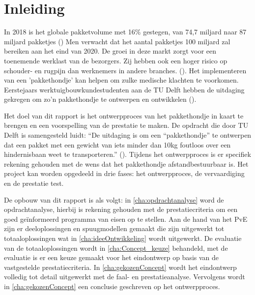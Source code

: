 \chapter{Inleiding}
\label{cha:inleiding}
In 2018 is het globale pakketvolume met 16\% gestegen, van 74,7 miljard naar 87 miljard pakketjes (\cite{pitney_bowes_2018}) Men verwacht dat het aantal pakketjes 100 miljard zal bereiken aan het eind van 2020. De groei in deze markt zorgt voor een toenemende werklast van de bezorgers. Zij hebben ook een hoger risico op schouder- en rugpijn dan werknemers in andere branches. (\cite{hurley_marshall_hogan_wells_2012}). Het implementeren van een 'pakkethondje' kan helpen om zulke medische klachten te voorkomen. Eerstejaars werktuigbouwkundestudenten aan de TU Delft hebben de uitdaging gekregen om zo'n pakkethondje te ontwerpen en ontwikkelen (\cite{beek_2020_opdracht}).
\vspace{\baselineskip}

Het doel van dit rapport is het ontwerpproces van het pakkethondje in kaart te brengen en een voorspelling van de prestatie te maken. De opdracht die door TU Delft is samengesteld luidt: “De uitdaging is om een “pakkethondje” te ontwerpen dat een pakket met een gewicht van iets minder dan 10kg foutloos over een hindernisbaan weet te transporteren.” (\cite{beek_2020_opdracht}). Tijdens het ontwerpproces is er specifiek rekening gehouden met de wens dat het pakkethondje afstandbestuurbaar is. Het project kan worden opgedeeld in drie fases: het ontwerpproces, de vervaardiging en de prestatie test.
\vspace{\baselineskip}

De opbouw van dit rapport is als volgt: in \cref{cha:opdrachtanalyse} word de opdrachtanalyse, hierbij is rekening gehouden met de prestatiecriteria om een goed geïnformeerd programma van eisen op te stellen. Aan de hand van het PvE zijn er deeloplossingen en spuugmodellen gemaakt die zijn uitgewerkt tot totaaloplossingen wat in \cref{cha:ideeOntwikkeling} wordt uitgewerkt. De evaluatie van de totaaloplossingen wordt in \cref{cha:Concept_keuze} behandeld, met de evaluatie is er een keuze gemaakt voor het eindontwerp op basis van de vastgestelde prestatiecriteria. In \cref{cha:gekozenConcept} wordt het eindontwerp volledig tot detail uitgewerkt met de faal- en prestatieanalyse. Vervolgens wordt in \cref{cha:gekozenConcept} een conclusie geschreven op het ontwerpproces. 
